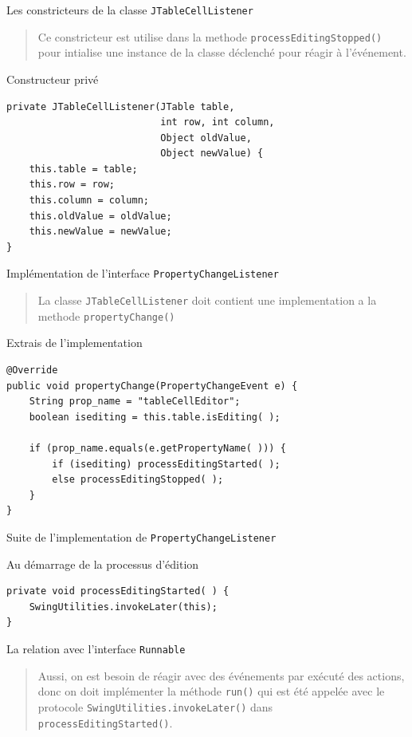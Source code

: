 \documentclass[captions=tableheading]{beamer}
\begin{document}
\begin{frame}[fragile,label={sec:org90021bc}]{Les constricteurs de la classe \texttt{JTableCellListener}}
 \begin{quote}
Ce constricteur est utilise dans la methode \texttt{processEditingStopped()} pour intialise une instance de la classe déclenché pour réagir à l'événement.
\end{quote}
\begin{block}{Constructeur privé}
\begin{verbatim}
private JTableCellListener(JTable table,
                           int row, int column,
                           Object oldValue,
                           Object newValue) {
    this.table = table;
    this.row = row;
    this.column = column;
    this.oldValue = oldValue;
    this.newValue = newValue;
}
\end{verbatim}
\end{block}
\end{frame}

\begin{frame}[fragile,label={sec:orgd487126}]{Implémentation de l'interface \texttt{PropertyChangeListener}}
 \begin{quote}
La classe \texttt{JTableCellListener} doit contient une implementation a la      methode \texttt{propertyChange()}
\end{quote}
\pause

\begin{block}{Extrais de l'implementation}
\begin{verbatim}
@Override
public void propertyChange(PropertyChangeEvent e) {
    String prop_name = "tableCellEditor";
    boolean isediting = this.table.isEditing( );

    if (prop_name.equals(e.getPropertyName( ))) {
        if (isediting) processEditingStarted( );
        else processEditingStopped( );
    }
}
\end{verbatim}
\end{block}
\end{frame}
\begin{frame}[fragile,label={sec:org6b5984a}]{Suite de l'implementation de \texttt{PropertyChangeListener}}
 \begin{block}{Au démarrage de la processus d'édition}
\begin{verbatim}
private void processEditingStarted( ) {
    SwingUtilities.invokeLater(this);
}
\end{verbatim}
\pause
\end{block}
\begin{block}{La relation avec l'interface \texttt{Runnable}}
\begin{quote}
Aussi, on est besoin de réagir avec des événements par exécuté des actions, donc on doit implémenter la méthode \texttt{run()} qui est été appelée avec le protocole \texttt{SwingUtilities.invokeLater()} dans \texttt{processEditingStarted()}.
\end{quote}
\end{block}
\end{frame}
\end{document}
